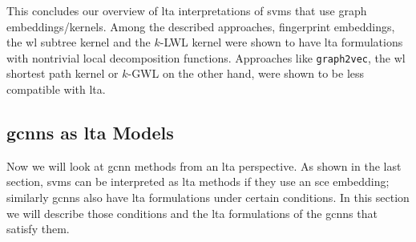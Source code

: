 This concludes our overview of \ac{lta} interpretations of \acp{svm} that use graph embeddings/kernels.
Among the described approaches, fingerprint embeddings, the \ac{wl} subtree kernel and the $k$-LWL kernel were shown to have \ac{lta} formulations with nontrivial local decomposition functions.
Approaches like \texttt{graph2vec}, the \ac{wl} shortest path kernel or $k$-GWL on the other hand, were shown to be less compatible with \ac{lta}.

\subsection{\acsp*{gcnn} as \acs*{lta} Models}%
\label{sec:ltag:formulation:gcnn}

Now we will look at \ac{gcnn} methods from an \ac{lta} perspective.
As shown in the last section, \acp{svm} can be interpreted as \ac{lta} methods if they use an \ac{sce} embedding;
similarly \acp{gcnn} also have \ac{lta} formulations under certain conditions.
In this section we will describe those conditions and the \ac{lta} formulations of the \acp{gcnn} that satisfy them.

